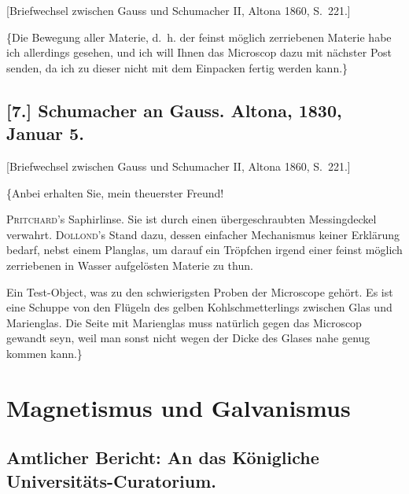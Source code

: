 \documentclass[12pt,a4paper]{article}
\begin{document}
[Briefwechsel zwischen Gauss und Schumacher II, Altona 1860, S.~221.]

\medskip\noindent
\{Die Bewegung aller Materie, d.~h. der feinst m\"oglich zerriebenen Materie habe ich allerdings gesehen, und ich will Ihnen das Microscop dazu mit n\"achster Post senden, da ich zu dieser nicht mit dem Einpacken fertig werden kann.\dotfill\}

\subsection*{[7.] Schumacher an Gauss. Altona, 1830, Januar 5.}

[Briefwechsel zwischen Gauss und Schumacher II, Altona 1860, S.~221.]

\medskip\noindent
\{Anbei erhalten Sie, mein theuerster Freund!

\textsc{Pritchard}'s Saphirlinse. Sie ist durch einen \"ubergeschraubten Messingdeckel verwahrt. \textsc{Dollond}'s Stand dazu, dessen einfacher Mechanismus keiner Erkl\"arung bedarf, nebst einem Planglas, um darauf ein Tr\"opfchen irgend einer feinst m\"oglich zerriebenen in Wasser aufgel\"osten Materie zu thun.

Ein Test-Object, was zu den schwierigsten Proben der Microscope geh\"ort. Es ist eine Schuppe von den Fl\"ugeln des gelben Kohlschmetterlings zwischen Glas und Marienglas. Die Seite mit Marienglas muss nat\"urlich gegen das Microscop gewandt seyn, weil man sonst nicht wegen der Dicke des Glases nahe genug kommen kann.\}


\newpage
\section*{Magnetismus und Galvanismus}

\subsection*{Amtlicher Bericht: An das K\"onigliche Universit\"ats-Curatorium.}
\end{document}
